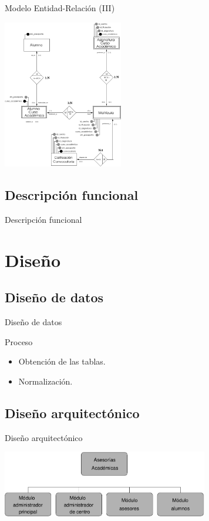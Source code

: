 \documentclass[10pt, hyperref={pdfpagelabels=false}]{beamer}
\begin{document}
      \begin{frame}{Modelo Entidad-Relación (III)}
        \begin{center}
          \includegraphics[height=6.5cm]{Diagramas/diagramaER-2}
        \end{center}
      \end{frame}

    \subsection{Descripción funcional}
      \begin{frame}{Descripción funcional}

      \end{frame}


  \section{Diseño}
    \subsection{Diseño de datos}
      \begin{frame}{Diseño de datos}
        \begin{block}{Proceso}
          \begin{itemize}
            \item Obtención de las tablas.
            \item Normalización.
          \end{itemize}
        \end{block}
        
      \end{frame}

    \subsection{Diseño arquitectónico}
      \begin{frame}{Diseño arquitectónico}
        \begin{center}
          \includegraphics[width=9cm]{Diagramas/disenyoArquitectonico}
        \end{center}
      \end{frame}
\end{document}
